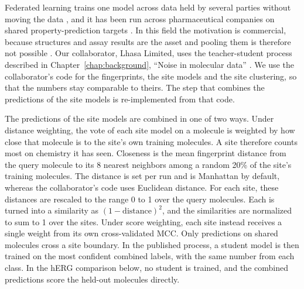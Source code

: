 Federated learning trains one model across data held by several parties without moving the data \citep{McMahan2017}, and it has been run across pharmaceutical companies on shared property-prediction targets \citep{Heyndrickx2024}. In this field the motivation is commercial, because structures and assay results are the asset and pooling them is therefore not possible \citep{Hanser2023,Bassani2023}. Our collaborator, Lhasa Limited, uses the teacher-student process described in Chapter~\ref{chap:background}, ``Noise in molecular data'' \citep{Hanser2025}. We use the collaborator's code for the fingerprints, the site models and the site clustering, so that the numbers stay comparable to theirs. The step that combines the predictions of the site models is re-implemented from that code.

The predictions of the site models are combined in one of two ways. Under distance weighting, the vote of each site model on a molecule is weighted by how close that molecule is to the site's own training molecules. A site therefore counts most on chemistry it has seen. Closeness is the mean fingerprint distance from the query molecule to its 8 nearest neighbors among a random 20\% of the site's training molecules. The distance is set per run and is Manhattan by default, whereas the collaborator's code uses Euclidean distance. For each site, these distances are rescaled to the range 0 to 1 over the query molecules. Each is turned into a similarity as $(1 - \text{distance})^2$, and the similarities are normalized to sum to 1 over the sites. Under score weighting, each site instead receives a single weight from its own cross-validated MCC. Only predictions on shared molecules cross a site boundary. In the published process, a student model is then trained on the most confident combined labels, with the same number from each class. In the hERG comparison below, no student is trained, and the combined predictions score the held-out molecules directly.

